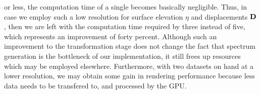 or less, the computation time of a single \IDFT becomes basically negligible.
Thus, in case we employ such a low resolution for surface elevation $\eta$ and
displacements $\mathbf{D}$, then we are left with the computation time required
by three \IDFTs instead of five, which represents an improvement of forty percent.
Although such an improvement to the transformation stage does not change
the fact that spectrum generation is the bottleneck of our implementation,
it still frees up resources which may be employed elsewhere.
Furthermore, with two datasets on hand at a lower resolution, we may obtain some
gain in rendering performance because less data needs to be transfered to,
and processed by the GPU.
%
%

%
